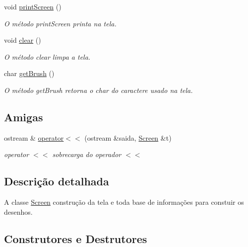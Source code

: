 \begin{DoxyCompactItemize}
\mbox{\label{class_screen_aaf2a84bfc1a990593b9c5a7fc4f5a7c2}} 
void \mbox{\hyperlink{class_screen_aaf2a84bfc1a990593b9c5a7fc4f5a7c2}{print\+Screen}} ()
\begin{DoxyCompactList}\small\item\em O método print\+Screen printa na tela. \end{DoxyCompactList}\item 
\mbox{\label{class_screen_a35e74266b2a04e37b354ceff7a5f1031}} 
void \mbox{\hyperlink{class_screen_a35e74266b2a04e37b354ceff7a5f1031}{clear}} ()
\begin{DoxyCompactList}\small\item\em O método clear limpa a tela. \end{DoxyCompactList}\item 
\mbox{\label{class_screen_a498a1c1b81f8463dfb7c7faebf0c4016}} 
char \mbox{\hyperlink{class_screen_a498a1c1b81f8463dfb7c7faebf0c4016}{get\+Brush}} ()
\begin{DoxyCompactList}\small\item\em O método get\+Brush retorna o char do caractere usado na tela. \end{DoxyCompactList}\end{DoxyCompactItemize}
\subsection*{Amigas}
\begin{DoxyCompactItemize}
\item 
ostream \& \mbox{\hyperlink{class_screen_aade3857efd573e64caa202f30e8927b3}{operator$<$$<$}} (ostream \&saida, \mbox{\hyperlink{class_screen}{Screen}} \&t)
\begin{DoxyCompactList}\small\item\em operator $<$$<$ sobrecarga do operador $<$$<$ \end{DoxyCompactList}\end{DoxyCompactItemize}


\subsection{Descrição detalhada}
A classe \mbox{\hyperlink{class_screen}{Screen}} construção da tela e toda base de informações para constuir os desenhos. 

\subsection{Construtores e Destrutores}
\mbox{\label{class_screen_a085b573146de76e3750a579b4dc599dd}} 
